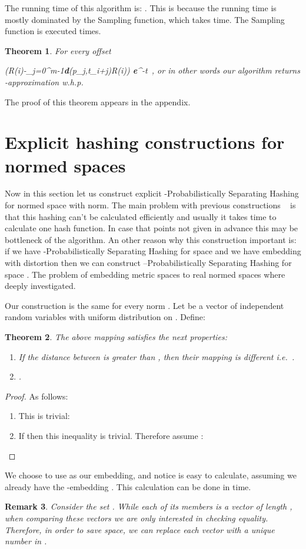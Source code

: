 \documentclass[11pt]{article}
\newtheorem{thm}{Theorem}[section]
\newtheorem{rem}[thm]{Remark}
\newcommand{\be}{}
\newcommand{\envert}[1]{\left\lvert#1\right\rvert}
\let\abs=\envert
\newcommand{\bfe}{\textbf{e}}
\newcommand{\dist}{\textbf{d}}
\begin{document}
The running time of this algorithm is:
.
This is because the running time is mostly dominated by the
Sampling function, which takes  time. The
Sampling function is executed
 times.
\begin{thm}
For every offset 
\be
\Pr\left(\abs{R(i)-\sum_{j=0}^{m-1}\dist(p_j,t_{i+j})}\geq \varepsilon R(i)\right) \leq \bfe^{-t}\ ,
\ee
or in other words our algorithm returns -approximation w.h.p.
\end{thm}
The proof of this theorem appears in the appendix.


\section{Explicit hashing constructions for normed spaces}{\label{explicit}}
Now in this section let us construct explicit
-Probabilistically Separating Hashing for normed space
 with  norm. The
main problem with previous constructions ~\cite{CCGGP98} is that
this hashing can't be calculated efficiently and usually it takes
 time to calculate one hash function. In case that
points not given in advance this may be bottleneck of the
algorithm.
 An other reason why this construction important is:
  if we have  -Probabilistically Separating Hashing for space  and we have embedding  with distortion 
  then we can construct --Probabilistically Separating Hashing for space .
  The problem of embedding metric spaces to real normed spaces where deeply investigated.

Our construction is the same for every norm .
 Let  be a vector
of  independent random variables with uniform distribution on
. Define:



\begin{thm}\label{emmbed}
The above mapping  satisfies the next properties:
\begin{enumerate}
\item If the distance between  is greater than , then their mapping
  is different i.e.\
  .
\item  .
\end{enumerate}
\end{thm}
\begin{proof} As follows:
\begin{enumerate}
\item This is  trivial:

\item If  then this inequality is trivial.
Therefore assume  :

\end{enumerate}
\end{proof}
We choose to use  as our embedding, and notice  is easy
to calculate, assuming we already have the -embedding .
This calculation can be done in  time.
\begin{rem}
Consider the set . While each
of its members is a vector of length , when comparing these
vectors we are only interested in checking equality. Therefore, in
order to save space, we can replace each vector with a unique
number in .
\end{rem}
\end{document}
